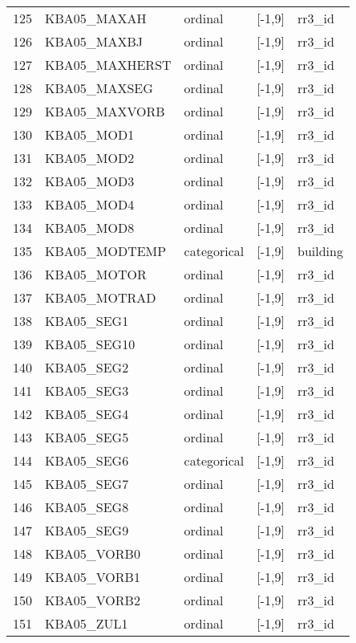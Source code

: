 \begin{longtable}{lllll}
125 &  KBA05\_MAXAH &  ordinal & [-1,9] &    rr3\_id \\
126 &  KBA05\_MAXBJ &  ordinal & [-1,9] &    rr3\_id \\
127 &   KBA05\_MAXHERST &  ordinal & [-1,9] &    rr3\_id \\
128 &     KBA05\_MAXSEG &  ordinal & [-1,9] &    rr3\_id \\
129 &    KBA05\_MAXVORB &  ordinal & [-1,9] &    rr3\_id \\
130 &   KBA05\_MOD1 &  ordinal & [-1,9] &    rr3\_id \\
131 &   KBA05\_MOD2 &  ordinal & [-1,9] &    rr3\_id \\
132 &   KBA05\_MOD3 &  ordinal & [-1,9] &    rr3\_id \\
133 &   KBA05\_MOD4 &  ordinal & [-1,9] &    rr3\_id \\
134 &   KBA05\_MOD8 &  ordinal & [-1,9] &    rr3\_id \\
135 &    KBA05\_MODTEMP &  categorical & [-1,9] &  building \\
136 &  KBA05\_MOTOR &  ordinal & [-1,9] &    rr3\_id \\
137 &     KBA05\_MOTRAD &  ordinal & [-1,9] &    rr3\_id \\
138 &   KBA05\_SEG1 &  ordinal & [-1,9] &    rr3\_id \\
139 &  KBA05\_SEG10 &  ordinal & [-1,9] &    rr3\_id \\
140 &   KBA05\_SEG2 &  ordinal & [-1,9] &    rr3\_id \\
141 &   KBA05\_SEG3 &  ordinal & [-1,9] &    rr3\_id \\
142 &   KBA05\_SEG4 &  ordinal & [-1,9] &    rr3\_id \\
143 &   KBA05\_SEG5 &  ordinal & [-1,9] &    rr3\_id \\
144 &   KBA05\_SEG6 &  categorical & [-1,9] &    rr3\_id \\
145 &   KBA05\_SEG7 &  ordinal & [-1,9] &    rr3\_id \\
146 &   KBA05\_SEG8 &  ordinal & [-1,9] &    rr3\_id \\
147 &   KBA05\_SEG9 &  ordinal & [-1,9] &    rr3\_id \\
148 &  KBA05\_VORB0 &  ordinal & [-1,9] &    rr3\_id \\
149 &  KBA05\_VORB1 &  ordinal & [-1,9] &    rr3\_id \\
150 &  KBA05\_VORB2 &  ordinal & [-1,9] &    rr3\_id \\
151 &   KBA05\_ZUL1 &  ordinal & [-1,9] &    rr3\_id \\

\end{longtable}
